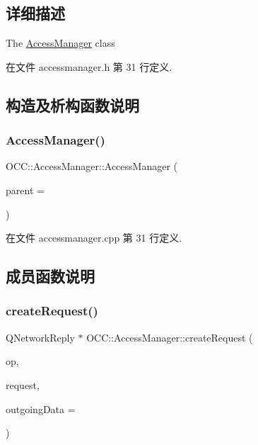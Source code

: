 \subsection{详细描述}
The \hyperlink{class_o_c_c_1_1_access_manager}{Access\+Manager} class 

在文件 accessmanager.\+h 第 31 行定义.



\subsection{构造及析构函数说明}
\mbox{\label{class_o_c_c_1_1_access_manager_a96b34c140a6c327023f2fbb95e76aa6b}} 
\subsubsection{\texorpdfstring{Access\+Manager()}{AccessManager()}}
{\footnotesize\ttfamily O\+C\+C\+::\+Access\+Manager\+::\+Access\+Manager (\begin{DoxyParamCaption}\item[{Q\+Object $\ast$}]{parent = {} }\end{DoxyParamCaption})}



在文件 accessmanager.\+cpp 第 31 行定义.



\subsection{成员函数说明}
\mbox{\label{class_o_c_c_1_1_access_manager_aed4b6d6996a748522bb9b55493df6d2a}} 
\subsubsection{\texorpdfstring{create\+Request()}{createRequest()}}
{\footnotesize\ttfamily Q\+Network\+Reply $\ast$ O\+C\+C\+::\+Access\+Manager\+::create\+Request (\begin{DoxyParamCaption}\item[{Q\+Network\+Access\+Manager\+::\+Operation}]{op,  }\item[{const Q\+Network\+Request \&}]{request,  }\item[{Q\+I\+O\+Device $\ast$}]{outgoing\+Data = {} }\end{DoxyParamCaption})\hspace{0.3cm}{\ttfamily [protected]}}



